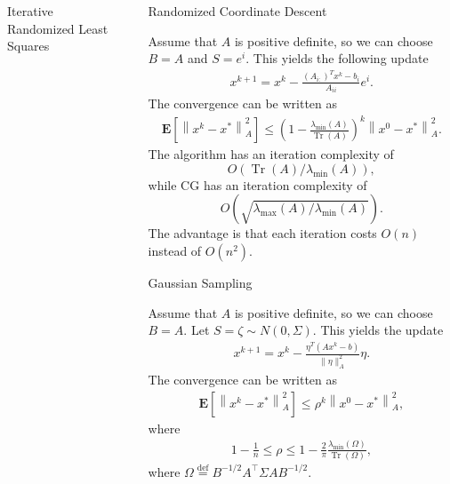 \documentclass[final, 20pt]{beamer}
\newlength{\sepwid}
\newlength{\onecolwid}
\begin{document}
\begin{frame}[t]
\begin{columns}[t]
\begin{column}{\onecolwid}
\begin{alertblock}{Iterative Randomized Least Squares}
\begin{flushleft}
\end{flushleft}
\end{alertblock}
\end{column} 

\begin{column}{\sepwid}\end{column} %

\begin{column}{\onecolwid}


\begin{block}{Randomized Coordinate Descent}
\begin{flushleft}
Assume that $A$ is positive definite, so we can choose $B=A$ and $S=e^i$. This yields the following update
\begin{align}
x^{k+1}=x^{k}-\frac{\left(A_{i :}\right)^{T} x^{k}-b_{i}}{A_{i i}} e^{i}.
\end{align}
The convergence can be written as
\begin{align}
\mathbf{E}\left[\left\|x^{k}-x^{*}\right\|_{A}^{2}\right] \leq\left(1-\frac{\lambda_{\min }(A)}{\operatorname{Tr}(A)}\right)^{k}\left\|x^{0}-x^{*}\right\|_{A}^{2}.
\end{align}
The algorithm has an iteration complexity of
\[
O\left(\operatorname{Tr}(A) / \lambda_{\min }(A)\right),
\]
while CG has an iteration complexity of $$O(\sqrt{\lambda_{\max }(A) / \lambda_{\min }(A)}).$$ The advantage is that each iteration costs $O(n)$ instead of $O(n^2)$. 
\end{flushleft}
\end{block}
\begin{block}{Gaussian Sampling}
\begin{flushleft}
Assume that $A$ is positive definite, so we can choose $B=A$. Let $S = \zeta \sim N(0, \Sigma)$. This yields the update 
\begin{align}
x^{k+1}=x^{k}-\frac{\eta^{T}\left(A x^{k}-b\right)}{\|\eta\|_{A}^{2}} \eta.
\end{align}
The convergence can be written as
\begin{align}
\mathbf{E}\left[\left\|x^{k}-x^{*}\right\|_{A}^{2}\right] \leq\rho^k \left\|x^{0}-x^{*}\right\|_{A}^{2},
\end{align}
where 
\begin{align}
1-\frac{1}{n} \leq \rho \leq 1-\frac{2}{\pi} \frac{\lambda_{\min }(\Omega)}{\operatorname{Tr}(\Omega)},
\end{align}
where $\Omega \stackrel{\mathrm{def}}{=} B^{-1 / 2} A^{\top} \Sigma A B^{-1 / 2}$.
\end{flushleft}
\end{block}




\end{column}
\end{columns}
\end{frame}
\end{document}
